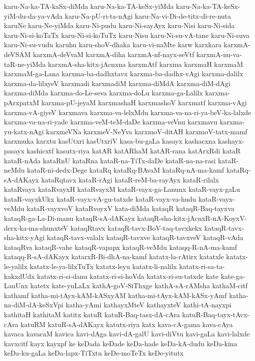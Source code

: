{karu-Na-ka-TA-kaSx-diMda
karu-Na-ka-TA-keSx-yiMda
karu-Na-ka-TA-keSx-yiM-du-da-ya-vAda
karu-Na-pU-ri-ta-nAgi
karu-Na-vi-Di-de-titx-di-re-nuta
karuNe
karu-Ne-yiMda
karu-Ni-pudu
karu-Ni-sayAyx
karu-Nisi
karu-Ni-sida
karu-Ni-si-koTaTx
karu-Ni-si-koTuTx
karu-Nisu
karu-Ni-su-vA-tane
karu-Ni-suva
karu-Ni-su-vudu
karuhu
karu-shoV-dhaka
karu-vi-naMte
karw
karxkara
karxmA-deVSAM
karxmA-deVvaM
karxmA-diha
karxmA-nf-nayx-seVtf
karxmA-nu-va-taR-ne-yiMda
karxmA-sha-kitx-jAcnxna
karxmAtf
karxma
karxmaH
karxmaM
karxmaM-ga-Lana
karxma-ba-dadhxtavx
karxma-ba-dadhx-vAgi
karxma-dalilx
karxma-da-lilxyeV
karxmadi
karxmadiM
karxma-diMdA
karxma-diM-dAgi
karxma-diMda
karxma-do-Le-seva
karxma-doLu
karxma-ga-Lalilx
karxma-pArxpatxM
karxma-pU-jeyaM
karxmashaH
karxmashoV
karxmatf
karxma-vAgi
karxma-vA-giyeV
karxmava
karxma-va-lelxMdu
karxma-va-na-ri-ya-beV-ka-lalxde
karxma-va-na-ri-yade
karxma-veM-teM-daDe
karxma-veVnu
karxmavu
karxma-yu-katx-nAgi
karxmeVNa
karxmeV-NeYva
karxmoV-ditAH
karxmoV-tatx-mamf
karxmuka
karxtu
kasUtxri
kasUtxriV
kasa-bu-gaLa
kasayx
kashacxna
kashayx-pasayx
kashicxtf
kasutx-riya
katAR
katARhaM
katAR-rana
katArxRdi
kataR
kataR-nAda
kataRnU
kataRna
kataR-na-TiTx-daDe
kataR-na-na-rasi
kataR-neMdu
kataR-ni-dedx-Dege
kataRq
kataRq-BAvaM
kataRq-nA-ma-kamf
kataRq-sA-dAKayx
kataRqtavx
kataR-rAgi
kataR-reM-ba-rayAyx
kataR-rilalx
kataRvayx
kataRvayxH
kataRvayxM
kataR-vayx-ga-Lanunx
kataR-vayx-gaLu
kataR-vayxkUkx
kataR-vayx-vA-gu-tatxde
kataR-vayx-va-hudu
kataR-vayx-veMdu
kataR-vayxvoV
kataRvoyxV
kata-diMda
kataqR
kataqR-Baq-tayxva
kataqR-ga-La-Di-manu
kataqR-sA-dAKayx
kataqR-sha-kitx-jAcnxR-nA-KoyxV-derx-ka-ma-shunxteV
kataqRtavx
kataqR-tavx-BoV-taq-tavxkekx
kataqR-tavx-sha-kitx-yAgi
kataqR-tavx-valalx
kataqR-tavxve
kataqR-tavxveV
kataqR-vAda
kataqRva
kataqR-vahe
kataqR-vapapx
kataqR-veMdu
kataqq-R-nA-ma-kamf
kataqq-R-sA-dAKayx
katarxR-Bi-dhA-na-kamf
katatx-la-rAtirx
katatxle
katatx-le-yalilx
katatx-le-ya-lilxTuTx
katatx-leyu
katatx-li-nalilx
katatx-ri-sa-ta-kakxdUdx
katatx-ri-si-danu
katatx-ri-si-hoVda
katatx-ri-su-tatxde
kate
kate-ga-LanUnx
katetx
kate-yuLaLx
kathA-goV-SiThxge
kathA-sA-rAMsha
kathaM-citf
kathamf
katha-mi-tAyx-kAM-kASxyAM
katha-mi-tAyx-kAM-kASx-yAmf
katha-na-diM-dA-keSxVpi
katha-yAmi
kathayxMteV
kathayxteV
kathi-tA-nayxpi
kathitaH
kathitaM
katitx
katuR
katuR-Baq-tasx-dA-cAra
katuR-Baq-tayx-tAvx-cAra
katuRM
katuR-sA-dAKayx
katutx-riya
katx
kava-cA-gama
kava-cAya
kavaca
kavacaM
kavica
kavi-dAga
kavi-dA-galU
kavi-diVtu
kavi-gaLa
kavi-lalxde
kavxcitf
kayx
kayxpf
ke
keDada
keDade
keDa-hade
keDa-kA-dudu
keDa-kina
keDa-ku-gaLa
keDa-lapx-TiTxtu
keDe-moTeTx
keDe-yitutx
}
